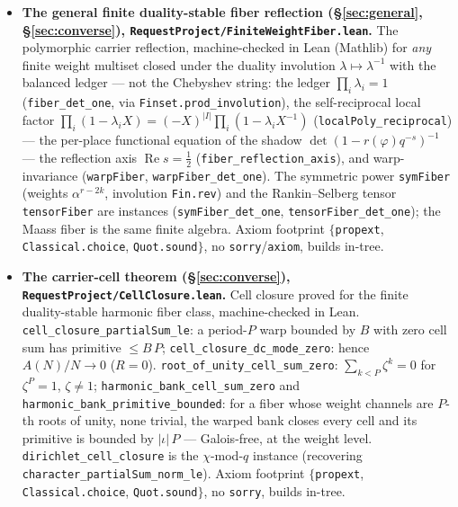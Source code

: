 \documentclass[11pt]{article}
\theoremstyle{definition}
\renewcommand{\Re}{\operatorname{Re}}
\begin{document}
\begin{itemize}
\item \textbf{The general finite duality-stable fiber reflection (\S\ref{sec:general},
\S\ref{sec:converse}), \texttt{RequestProject/FiniteWeightFiber.lean}.} The polymorphic carrier
reflection, machine-checked in Lean (Mathlib) for \emph{any} finite weight multiset closed under the
duality involution $\lambda\mapsto\lambda^{-1}$ with the balanced ledger --- not the Chebyshev string:
the ledger $\prod_i\lambda_i=1$ (\texttt{fiber\_det\_one}, via \texttt{Finset.prod\_involution}), the
self-reciprocal local factor $\prod_i(1-\lambda_iX)=(-X)^{|I|}\prod_i(1-\lambda_iX^{-1})$
(\texttt{localPoly\_reciprocal}) --- the per-place functional equation of the shadow
$\det(1-r(\varphi)q^{-s})^{-1}$ --- the reflection axis $\Re s=\tfrac12$
(\texttt{fiber\_reflection\_axis}), and warp-invariance (\texttt{warpFiber}, \texttt{warpFiber\_det\_one}).
The symmetric power \texttt{symFiber} (weights $\alpha^{r-2k}$, involution \texttt{Fin.rev}) and the
Rankin--Selberg tensor \texttt{tensorFiber} are instances (\texttt{symFiber\_det\_one},
\texttt{tensorFiber\_det\_one}); the Maass fiber is the same finite algebra.  Axiom footprint
$\{$\texttt{propext}, \texttt{Classical.choice}, \texttt{Quot.sound}$\}$, no \texttt{sorry}/\texttt{axiom},
builds in-tree.

\item \textbf{The carrier-cell theorem (\S\ref{sec:converse}), \texttt{RequestProject/CellClosure.lean}.}
Cell closure proved for the finite duality-stable harmonic fiber class, machine-checked in Lean.
\texttt{cell\_closure\_partialSum\_le}: a period-$P$ warp bounded by $B$ with zero cell sum has primitive
$\le B\,P$; \texttt{cell\_closure\_dc\_mode\_zero}: hence $A(N)/N\to0$ ($R=0$). \texttt{root\_of\_unity\_cell\_sum\_zero}:
$\sum_{k<P}\zeta^k=0$ for $\zeta^P=1$, $\zeta\ne1$; \texttt{harmonic\_bank\_cell\_sum\_zero} and
\texttt{harmonic\_bank\_primitive\_bounded}: for a fiber whose weight channels are $P$-th roots of unity,
none trivial, the warped bank closes every cell and its primitive is bounded by $|\iota|\,P$ --- Galois-free,
at the weight level. \texttt{dirichlet\_cell\_closure} is the $\chi$-mod-$q$ instance (recovering
\texttt{character\_partialSum\_norm\_le}). Axiom footprint $\{$\texttt{propext}, \texttt{Classical.choice},
\texttt{Quot.sound}$\}$, no \texttt{sorry}, builds in-tree.


\end{itemize}
\end{document}
